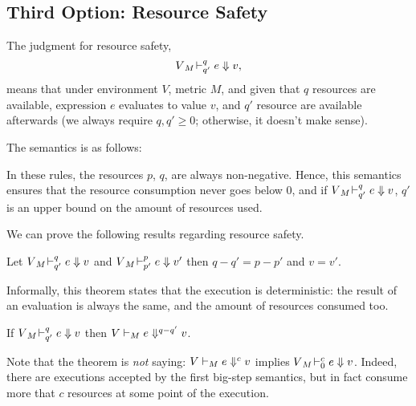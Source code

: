 \documentclass[ manuscript,screen, nonacm]{acmart}
\begin{document}
\subsection{Third Option: Resource Safety}

The judgment for resource safety, 
\[V {}_{M}\!\vdash^{q}_{q'} e \Downarrow v,\]
means that under environment $V$, metric $M$, and given that $q$ resources are available, expression $e$ evaluates to value $v$, and $q'$ resource are available afterwards (we always require $q,q'\geq 0$; otherwise, it doesn't make sense).

The semantics is as follows:
In these rules, the resources \(p\), \(q\), are always non-negative. Hence, this semantics
ensures that the resource consumption never goes below 0, and if \(V {}_{M}\!\vdash^{q}_{q'} e \Downarrow v\), \(q'\) is an upper bound on the amount of resources
used.

We can prove the following results regarding resource safety.
\begin{lemma}
Let $V {}_{M}\!\vdash^{q}_{q'} e \Downarrow v$ and $V {}_{M}\!\vdash^{p}_{p'} e \Downarrow v'$  
then $q-q'=p-p'$ and $v=v'$.
\end{lemma}
Informally, this theorem states that the execution is deterministic: the result of an
evaluation is always the same, and the amount of resources consumed too.

\begin{theorem}\label{resource-safety-big}
If $V {}_{M}\!\vdash^{q}_{q'} e \Downarrow v$ then $V \vdash_{M} e \Downarrow^{q-q'}v$.
\end{theorem} 
Note that the theorem is \emph{not} saying: $V \vdash_{M} e \Downarrow^{c}v$ implies $V {}_{M}\!\vdash^{c}_{0} e \Downarrow v$. Indeed, there are executions accepted by the first
big-step semantics, but in fact consume more that \(c\) resources at some point of the
execution.
\end{document}
